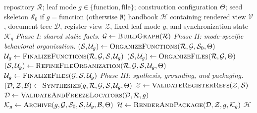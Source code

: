 \documentclass[]{ailab}
\begin{document}
\begin{algorithm}[H]
\caption{Harness Handbook Construction}
\label{alg:construction}
\begin{minipage}{0.96\linewidth}
\footnotesize
\renewcommand{\baselinestretch}{0.96}\selectfont
\begin{algorithmic}[1]
\Require repository $\mathcal{R}$; leaf mode
$g\in\{\mathrm{function},\mathrm{file}\}$; construction configuration $\Theta$;
seed skeleton $\mathcal{S}_0$ if $g=\mathrm{function}$ (otherwise $\emptyset$)
\Ensure handbook $\mathcal{H}$ containing rendered view $\mathcal{V}$, document
tree $\mathcal{D}$, register view $\mathcal{Z}$, fixed leaf mode $g$, and
synchronization state $\mathcal{K}_g$
\Statex \textit{Phase I: shared static facts.}
\State $\mathcal{G}\gets\Call{BuildGraph}{\mathcal{R}}$
\Statex
\Statex \textit{Phase II: mode-specific behavioral organization.}
    \State $(\mathcal{S},\mathcal{U}_g)\gets
    \Call{OrganizeFunctions}{\mathcal{R},\mathcal{G},\mathcal{S}_0,\Theta}$
    \State $\mathcal{U}_g\gets
    \Call{FinalizeFunctions}{\mathcal{R},\mathcal{G},\mathcal{S},\mathcal{U}_g}$
\Else {}
    \State $(\mathcal{S},\mathcal{U}_g)\gets
    \Call{OrganizeFiles}{\mathcal{R},\mathcal{G},\Theta}$
        \State $(\mathcal{S},\mathcal{U}_g)\gets
        \Call{RefineFileOrganization}{\mathcal{R},\mathcal{G},\mathcal{S},\mathcal{U}_g,\Theta}$
    \EndIf
    \State $\mathcal{U}_g\gets
    \Call{FinalizeFiles}{\mathcal{G},\mathcal{S},\mathcal{U}_g}$
\EndIf
\Statex
\Statex \textit{Phase III: synthesis, grounding, and packaging.}
\State $(\mathcal{D},\mathcal{Z},\mathcal{B})\gets
\Call{Synthesize}{g,\mathcal{R},\mathcal{G},\mathcal{S},\mathcal{U}_g,\Theta}$
\State $\mathcal{Z}\gets\Call{ValidateRegisterRefs}{\mathcal{Z},\mathcal{S}}$
\State $\mathcal{D}\gets
\Call{ValidateAndFreezeLocators}{\mathcal{D},\mathcal{R},g}$
\State $\mathcal{K}_g\gets
\Call{Archive}{g,\mathcal{G},\mathcal{S}_0,\mathcal{S},\mathcal{U}_g,\mathcal{B},\Theta}$
\State $\mathcal{H}\gets
\Call{RenderAndPackage}{\mathcal{D},\mathcal{Z},g,\mathcal{K}_g}$
\State \Return $\mathcal{H}$
\end{algorithmic}
\end{minipage}
\end{algorithm}
\end{document}
